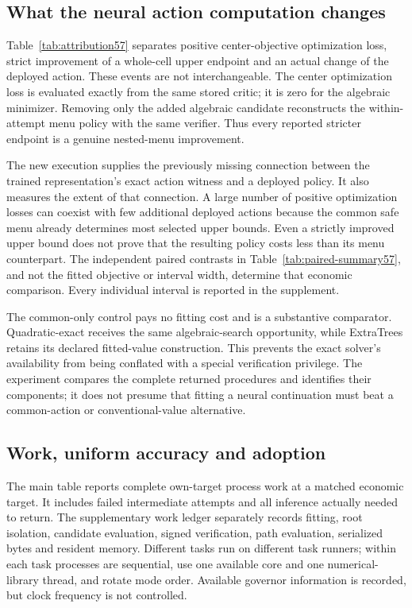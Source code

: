 


\subsection{What the neural action computation changes}
Table~\ref{tab:attribution57} separates positive center-objective optimization loss, strict improvement of a whole-cell upper endpoint and an actual change of the deployed action. These events are not interchangeable. The center optimization loss is evaluated exactly from the same stored critic; it is zero for the algebraic minimizer. Removing only the added algebraic candidate reconstructs the within-attempt menu policy with the same verifier. Thus every reported stricter endpoint is a genuine nested-menu improvement.




The new execution supplies the previously missing connection between the trained representation's exact action witness and a deployed policy. It also measures the extent of that connection. A large number of positive optimization losses can coexist with few additional deployed actions because the common safe menu already determines most selected upper bounds. Even a strictly improved upper bound does not prove that the resulting policy costs less than its menu counterpart. The independent paired contrasts in Table~\ref{tab:paired-summary57}, and not the fitted objective or interval width, determine that economic comparison. Every individual interval is reported in the supplement.

The common-only control pays no fitting cost and is a substantive comparator. Quadratic-exact receives the same algebraic-search opportunity, while ExtraTrees retains its declared fitted-value construction. This prevents the exact solver's availability from being conflated with a special verification privilege. The experiment compares the complete returned procedures and identifies their components; it does not presume that fitting a neural continuation must beat a common-action or conventional-value alternative.

\subsection{Work, uniform accuracy and adoption}
The main table reports complete own-target process work at a matched economic target. It includes failed intermediate attempts and all inference actually needed to return. The supplementary work ledger separately records fitting, root isolation, candidate evaluation, signed verification, path evaluation, serialized bytes and resident memory. Different tasks run on different task runners; within each task processes are sequential, use one available core and one numerical-library thread, and rotate mode order. Available governor information is recorded, but clock frequency is not controlled.


